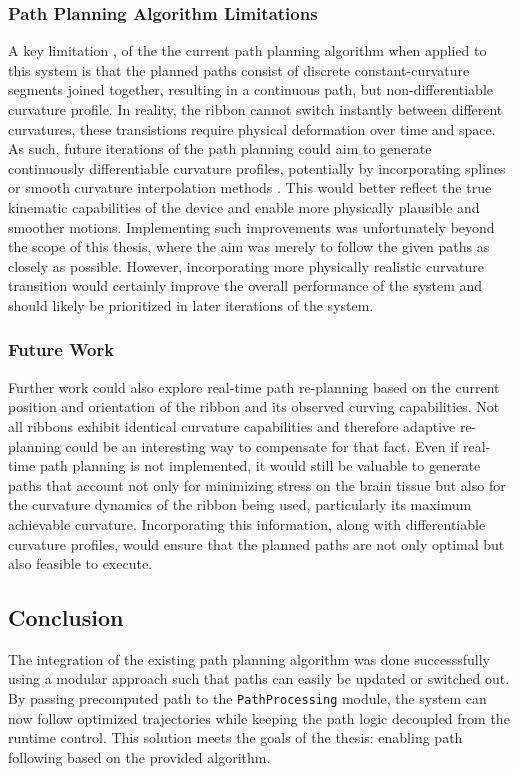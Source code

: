 \subsubsection{Path Planning Algorithm Limitations}
A key limitation , of the the current path planning algorithm when applied to this system is that the planned paths consist of discrete constant-curvature segments joined together, resulting in a continuous path, but non-differentiable curvature profile. In reality, the ribbon cannot switch instantly between different curvatures, these transistions require physical deformation over time and space. 
As such, future iterations of the path planning could aim to generate continuously differentiable curvature profiles, potentially by incorporating splines or smooth curvature interpolation methods \cite{fossen_handbook_2011}. This would better reflect the true kinematic capabilities of the device and enable more physically plausible and smoother motions.
\newline \newline
Implementing such improvements was unfortunately beyond the scope of this thesis, where the aim was merely to follow the given paths as closely as possible. However, incorporating more physically realistic curvature transition would certainly improve the overall performance of the system and should likely be prioritized in later iterations of the system.



\subsubsection{Future Work}
Further work could also explore real-time path re-planning based on the current position and orientation of the ribbon and its observed curving capabilities. Not all ribbons exhibit identical curvature capabilities and therefore adaptive re-planning could be an interesting way to compensate for that fact.
\newline \newline
Even if real-time path planning is not implemented, it would still be valuable to generate paths that account not only for minimizing stress on the brain tissue but also for the curvature dynamics of the ribbon being used, particularly its maximum achievable curvature. Incorporating this information, along with differentiable curvature profiles, would ensure that the planned paths are not only optimal but also feasible to execute.

\subsection{Conclusion}
The integration of the existing path planning algorithm was done successsfully using a modular approach such that paths can easily be updated or switched out. By passing precomputed path to the \texttt{PathProcessing} module, the system can now follow optimized trajectories while keeping the path logic decoupled from the runtime control. This solution meets the goals of the thesis: enabling path following based on the provided algorithm.


